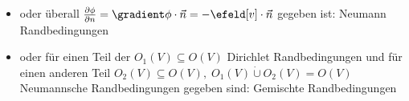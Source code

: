 \begin{frame}
\begin{itemize}[<+->]
\begin{itemize}
{                     Randbedingungen}
                   \item oder überall $\frac{\partial\phi}{\partial n}=\gradient\phi\cdot
         \vec{n}=-\efeld[v]\cdot\vec{n}$ gegeben ist: \alert{Neumann
           Randbedingungen}
         \item oder für einen Teil der $O_1(V)\subseteq O(V)$ Dirichlet
           Randbedingungen und für einen anderen Teil $O_2(V)\subseteq
           O(V),\; O_1(V) \mathbin{\dot{\cup}} O_2(V) = O(V)$ Neumannsche Randbedingungen gegeben sind:
           \alert{Gemischte Randbedingungen}   
                 \end{itemize}
         \end{itemize}

       \end{frame}

